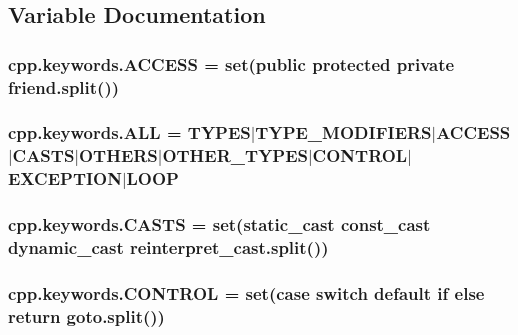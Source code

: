 \subsection{Variable Documentation}
\subsubsection[{\texorpdfstring{A\+C\+C\+E\+SS}{ACCESS}}]{\setlength{\rightskip}{0pt plus 5cm}cpp.\+keywords.\+A\+C\+C\+E\+SS = set(\textquotesingle{}public protected private friend\textquotesingle{}.split())}\hypertarget{namespacecpp_1_1keywords_a786f41bbea982641425c819d10bb2064}{}\label{namespacecpp_1_1keywords_a786f41bbea982641425c819d10bb2064}
\subsubsection[{\texorpdfstring{A\+LL}{ALL}}]{\setlength{\rightskip}{0pt plus 5cm}cpp.\+keywords.\+A\+LL = {\bf T\+Y\+P\+ES}$\vert${\bf T\+Y\+P\+E\+\_\+\+M\+O\+D\+I\+F\+I\+E\+RS}$\vert${\bf A\+C\+C\+E\+SS}$\vert${\bf C\+A\+S\+TS}$\vert${\bf O\+T\+H\+E\+RS}$\vert${\bf O\+T\+H\+E\+R\+\_\+\+T\+Y\+P\+ES}$\vert${\bf C\+O\+N\+T\+R\+OL}$\vert${\bf E\+X\+C\+E\+P\+T\+I\+ON}$\vert${\bf L\+O\+OP}}\hypertarget{namespacecpp_1_1keywords_a2e8727b78fb9434c99ac8518c6dd1ecc}{}\label{namespacecpp_1_1keywords_a2e8727b78fb9434c99ac8518c6dd1ecc}
\subsubsection[{\texorpdfstring{C\+A\+S\+TS}{CASTS}}]{\setlength{\rightskip}{0pt plus 5cm}cpp.\+keywords.\+C\+A\+S\+TS = set(\textquotesingle{}static\+\_\+cast const\+\_\+cast dynamic\+\_\+cast reinterpret\+\_\+cast\textquotesingle{}.split())}\hypertarget{namespacecpp_1_1keywords_aeba38dc38e188040f4ec44ba05092e7f}{}\label{namespacecpp_1_1keywords_aeba38dc38e188040f4ec44ba05092e7f}
\subsubsection[{\texorpdfstring{C\+O\+N\+T\+R\+OL}{CONTROL}}]{\setlength{\rightskip}{0pt plus 5cm}cpp.\+keywords.\+C\+O\+N\+T\+R\+OL = set(\textquotesingle{}case switch default if else return goto\textquotesingle{}.split())}\hypertarget{namespacecpp_1_1keywords_a374dfe9c96681079802ba4724287b8ff}{}\label{namespacecpp_1_1keywords_a374dfe9c96681079802ba4724287b8ff}
